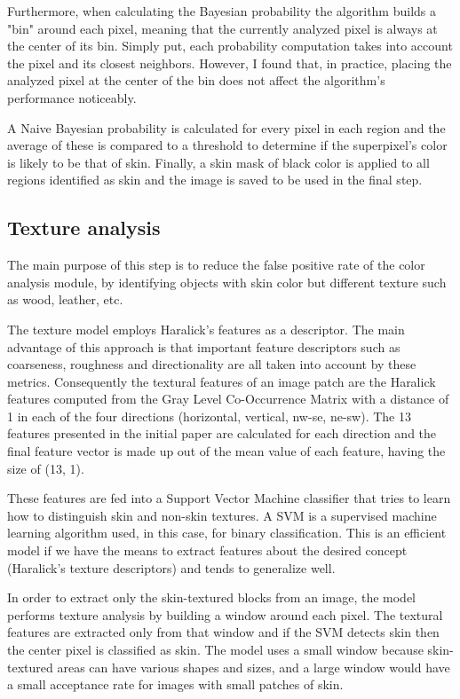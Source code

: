 \documentclass[12pt]{report}
\begin{document}
	Furthermore, when calculating the Bayesian probability the algorithm builds a "bin" around each pixel, meaning that the currently analyzed pixel is always at the center of its bin. Simply put, each probability computation takes into account the pixel and its closest neighbors. However, I found that, in practice, placing the analyzed pixel at the center of the bin does not affect the algorithm's performance noticeably.
	
	A Naive Bayesian probability is calculated for every pixel in each region and the average of these is compared to a threshold to determine if the superpixel's color is likely to be that of skin. Finally, a skin mask of black color is applied to all regions identified as skin and the image is saved to be used in the final step.
	
	\subsection{Texture analysis}
	The main purpose of this step is to reduce the false positive rate of the color analysis module, by identifying objects with skin color but different texture such as wood, leather, etc.
	
	The texture model employs Haralick's features as a descriptor. The main advantage of this approach is that important feature descriptors such as coarseness, roughness and directionality are all taken into account by these metrics\cite{haralick_features}. Consequently the textural features of an image patch are the Haralick features computed from the Gray Level Co-Occurrence Matrix with a distance of 1 in each of the four directions (horizontal, vertical, nw-se, ne-sw). The 13 features presented in the initial paper\cite{haralick_features} are calculated for each direction and the final feature vector is made up out of the mean value of each feature, having the size of (13, 1).
	
	These features are fed into a Support Vector Machine classifier that tries to learn how to distinguish skin and non-skin textures. A SVM is a supervised machine learning algorithm used, in this case, for binary classification. This is an efficient model if we have the means to extract features about the desired concept (Haralick's texture descriptors) and tends to generalize well\cite{advantage_svm}.
	
	In order to extract only the skin-textured blocks from an image, the model performs texture analysis by building a window around each pixel. The textural features are extracted only from that window and if the SVM detects skin then the center pixel is classified as skin. The model uses a small window because skin-textured areas can have various shapes and sizes, and a large window would have a small acceptance rate for images with small patches of skin.
	
\end{document}

